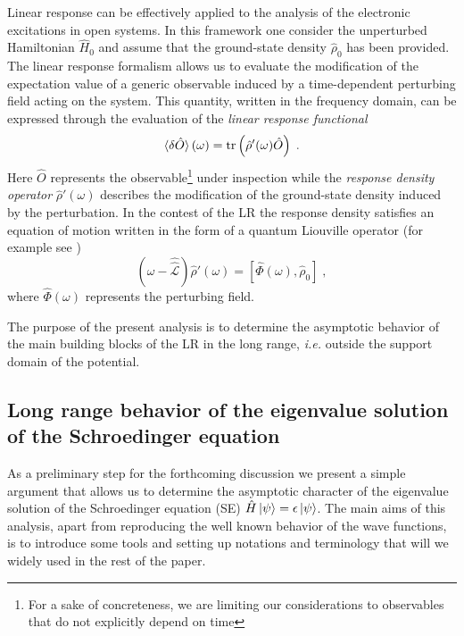 \documentclass[reprint,aps,prb]{revtex4-1}
\newcommand{\eps}{\epsilon}
\newcommand{\be}{\begin{equation}}
\newcommand{\ee}{\end{equation}}
\newcommand{\lb}{\label}
\newcommand{\op}[1]{\hat {#1}}
\newcommand{\sop}[1]{\op{\op {#1}}}
\newcommand{\commutator}[2]{\left[ {#1} , {#2} \right]}
\newcommand{\trace}[1]{\mathrm{tr}\left(#1\right)}
\newcommand{\dmnot}{\op{\rho}_0}
\newcommand{\dm}{\op{\rho}}
\newcommand{\hnot}{\op{H}_0}
\newcommand{\Liouv}{\sop{\mathcal L}}
\begin{document}
Linear response can be effectively applied to the analysis of the electronic excitations in open systems. In this framework one consider the unperturbed Hamiltonian $\hnot$ and assume that 
the ground-state density $\dmnot$ has been provided. The linear response formalism allows us to evaluate the modification of the expectation value of a generic observable induced by a 
time-dependent perturbing field acting on the system. This quantity, written in the frequency domain, can be expressed through the evaluation of the \emph{linear response functional}
\be\lb{LinearResponseFunctDef1}
\braket{\delta\op O}(\omega) = \trace{\dm'(\omega)\op O} \;.
\ee
Here $\op O$ represents the observable\footnote{For a sake of concreteness, we are limiting our considerations to observables that do not explicitly depend on time} under inspection 
while the \emph{response density operator} $\dm'(\omega)$ describes the modification of the ground-state density induced by the perturbation. In the contest of the LR the response 
density satisfies an equation of motion written in the form of a quantum Liouville operator (for example see \cite{baroni2008})
\be\lb{LiouvillianRhopomegaDef1}
\left(\omega - \Liouv\right) \dm'(\omega) =  \commutator{\op\Phi(\omega)}{\dmnot} \;,
\ee
where $\op\Phi(\omega)$ represents the perturbing field. 

The purpose of the present analysis is to determine the asymptotic behavior of the main building blocks of the LR in the long range, \emph{i.e.} outside the support domain of the potential. 

\subsection{Long range behavior of the eigenvalue solution of the Schroedinger equation}
\label{SEopenSystem}

As a preliminary step for the forthcoming discussion we present a simple argument that allows us to determine the asymptotic character of the eigenvalue solution of the Schroedinger equation (SE) 
$\op H\ket{\psi}=\eps\ket{\psi}$. The main aims of this analysis, apart from reproducing the well known behavior of the wave functions, is to introduce some tools and setting up notations and 
terminology that will we widely used in the rest of the paper. 
\end{document}
